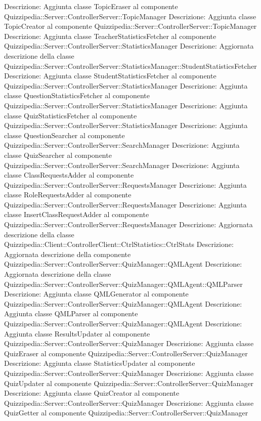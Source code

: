 Descrizione: Aggiunta classe TopicEraser al componente Quizzipedia::Server::ControllerServer::TopicManager 
Descrizione: Aggiunta classe TopicCreator al componente Quizzipedia::Server::ControllerServer::TopicManager 
Descrizione: Aggiunta classe TeacherStatisticsFetcher al componente Quizzipedia::Server::ControllerServer::StatisticsManager 
Descrizione: Aggiornata descrizione della classe Quizzipedia::Server::ControllerServer::StatisticsManager::StudentStatisticsFetcher 
Descrizione: Aggiunta classe StudentStatisticsFetcher al componente Quizzipedia::Server::ControllerServer::StatisticsManager 
Descrizione: Aggiunta classe QuestionStatisticsFetcher al componente Quizzipedia::Server::ControllerServer::StatisticsManager 
Descrizione: Aggiunta classe QuizStatisticsFetcher al componente Quizzipedia::Server::ControllerServer::StatisticsManager 
Descrizione: Aggiunta classe QuestionSearcher al componente Quizzipedia::Server::ControllerServer::SearchManager 
Descrizione: Aggiunta classe QuizSearcher al componente Quizzipedia::Server::ControllerServer::SearchManager 
Descrizione: Aggiunta classe ClassRequestsAdder al componente Quizzipedia::Server::ControllerServer::RequestsManager 
Descrizione: Aggiunta classe RoleRequestsAdder al componente Quizzipedia::Server::ControllerServer::RequestsManager 
Descrizione: Aggiunta classe InsertClassRequestAdder al componente Quizzipedia::Server::ControllerServer::RequestsManager 
Descrizione: Aggiornata descrizione della classe Quizzipedia::Client::ControllerClient::CtrlStatistics::CtrlStats 
Descrizione: Aggiornata descrizione della componente Quizzipedia::Server::ControllerServer::QuizManager::QMLAgent 
Descrizione: Aggiornata descrizione della classe Quizzipedia::Server::ControllerServer::QuizManager::QMLAgent::QMLParser 
Descrizione: Aggiunta classe QMLGenerator al componente Quizzipedia::Server::ControllerServer::QuizManager::QMLAgent 
Descrizione: Aggiunta classe QMLParser al componente Quizzipedia::Server::ControllerServer::QuizManager::QMLAgent 
Descrizione: Aggiunta classe ResultsUpdater al componente Quizzipedia::Server::ControllerServer::QuizManager 
Descrizione: Aggiunta classe QuizEraser al componente Quizzipedia::Server::ControllerServer::QuizManager 
Descrizione: Aggiunta classe StatisticsUpdater al componente Quizzipedia::Server::ControllerServer::QuizManager 
Descrizione: Aggiunta classe QuizUpdater al componente Quizzipedia::Server::ControllerServer::QuizManager 
Descrizione: Aggiunta classe QuizCreator al componente Quizzipedia::Server::ControllerServer::QuizManager 
Descrizione: Aggiunta classe QuizGetter al componente Quizzipedia::Server::ControllerServer::QuizManager 
